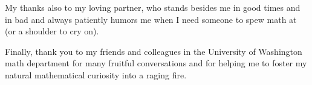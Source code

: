 \documentclass[12pt]{article}
\begin{document}
My thanks also to my loving partner, who stands besides me in good times and in bad and always patiently humors me when 
I need someone to spew math at (or a shoulder to cry on).

Finally, thank you to my friends and colleagues in the University of Washington math department for many fruitful conversations 
and for helping me to foster my natural mathematical curiosity into a raging fire.

\medskip

\printbibliography
{}
\end{document}
